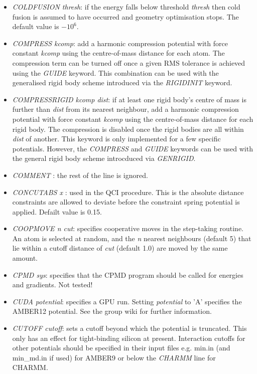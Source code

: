 \documentclass[12pt,a4paper,dvips]{article}
\begin{document}
\begin{itemize}
\item {\it COLDFUSION thresh\/}: if the energy falls below threshold {\it thresh} then
cold fusion is assumed to have occurred and geometry optimisation stops.
The default value is $-10^6$.

\item {\it COMPRESS kcomp\/}: add a harmonic compression potential with force constant {\it kcomp\/} using the
centre-of-mass distance for each atom.
The compression term can be turned off once a given RMS tolerance is achieved
using the {\it GUIDE} keyword.
This combination can be used with the generalised rigid body scheme introduced via the
{\it RIGIDINIT} keyword.

\item {\it COMPRESSRIGID kcomp\/ dist}: if at least one rigid body's centre of mass is further than {\it dist} from its nearest neighbour,  
add a harmonic compression potential with force constant {\it kcomp\/} using the centre-of-mass distance for each rigid body. The compression is 
disabled once the rigid bodies are all within {\it dist} of another. 
This keyword is only implemented for a few specific potentials. 
However, the {\it COMPRESS} and {\it GUIDE} keywords can be used with the general rigid body scheme
introcduced via {\it GENRIGID}.

\item {\it COMMENT \/}: the rest of the line is ignored.

\item {\it CONCUTABS x \/}: used in the QCI procedure. This is the
absolute distance constraints are allowed to deviate before the constraint
spring potential is applied.
Defailt value is 0.15.

\item {\it COOPMOVE n cut\/}: specifies cooperative moves in the step-taking routine. An atom is
selected at random, and the {\it n} nearest neighbours (default 5) that lie within a cutoff
distance of {\it cut} (default 1.0) are moved by the same amount.

\item {\it CPMD sys\/}: specifies that the CPMD program should be called for energies and gradients. Not
tested!

\item {\it CUDA potential\/}: specifies a GPU run. Setting {\it potential} to 'A' specifies the AMBER12 potential. See the group wiki for further information. 

\item {\it CUTOFF cutoff\/}: sets a cutoff beyond which the potential is truncated. This
only has an effect for tight-binding silicon at present. Interaction cutoffs for other potentials
should be specified in their input files e.g. {\textrm min.in} (and {\textrm min\_md.in} if used) 
for AMBER9 or below the {\it CHARMM} line for CHARMM.


\end{itemize}
\end{document}
